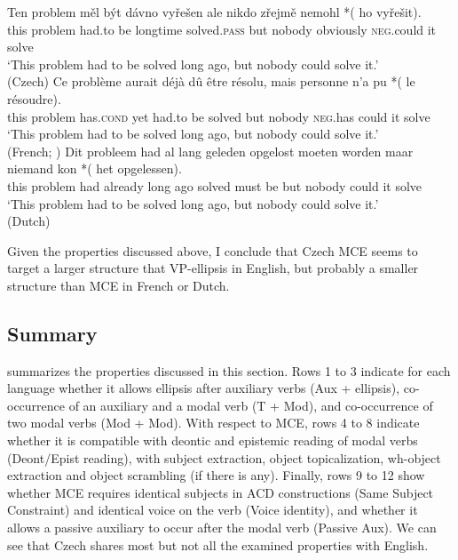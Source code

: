 \documentclass[output=paper,colorlinks,citecolor=brown,
modfonts
]{langscibook}
\begin{document}
\begin{exe}
\ex \label{30}
\begin{xlist}
\ex \label{30a} 
\gll Ten problem měl být dávno vyřešen ale nikdo zřejmě nemohl *(\hspace{-2pt} ho vyřešit).\\
this problem had.to be longtime solved.\textsc{pass} but nobody obviously \textsc{neg}.could  {} it solve\\
\glt `This problem had to be solved long ago, but nobody could solve it.' \\ \hfill (Czech)
\ex \label{30b}
\gll Ce problème aurait déjà dû être résolu, mais personne n'a pu *(\hspace{-2pt} le résoudre).\\
this problem has.\textsc{cond} yet had.to be solved but nobody \textsc{neg}.has could  {} it solve\\
\glt `This problem had to be solved long ago, but nobody could solve it.' \\ \hfill (French; \citealt{Dagnac2010})
\ex \label{30c}
\gll  Dit probleem had al lang geleden opgelost moeten worden maar niemand  kon *(\hspace{-2pt} het opgelessen). \\
 this problem  had already long ago solved must be but nobody could {} it solve\\
\glt `This problem had to be solved long ago, but nobody could solve it.' \\  \hfill (Dutch) \\
\end{xlist}
\end{exe}

\noindent Given the properties discussed above, I conclude that Czech MCE seems to target a larger structure that VP-ellipsis in English, but probably a smaller structure than MCE in French or Dutch. 

\subsection{Summary} \label{sec:4.3}

 summarizes the properties discussed in this section. Rows 1 to 3 indicate for each language whether it allows ellipsis after auxiliary verbs (Aux + ellipsis), co-occurrence of an auxiliary and a modal verb (T + Mod), and co-occurrence of two modal verbs (Mod + Mod). With respect to MCE, rows 4 to 8 indicate whether it is compatible with deontic and epistemic reading of modal verbs (Deont/Epist reading), with subject extraction, object topicalization, wh-object extraction and object scrambling (if there is any). Finally, rows 9 to 12 show whether MCE requires identical subjects in ACD constructions (Same Subject Constraint) and identical voice on the verb (Voice identity), and whether it allows a passive auxiliary to occur after the modal verb (Passive Aux). We can see that Czech shares most but not all the examined properties with English. 
\end{document}

